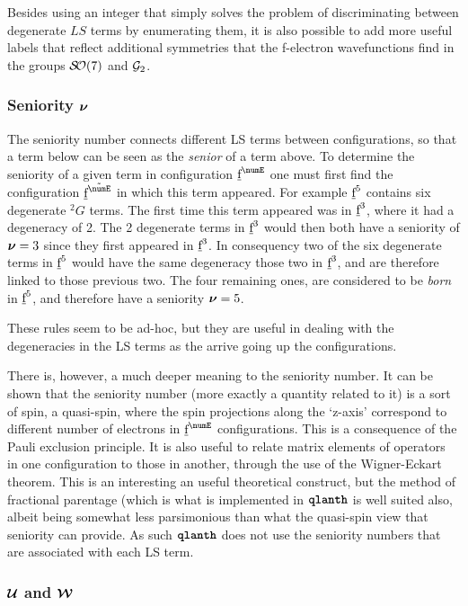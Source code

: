 \documentclass{article}
\begin{document}
Besides using an integer that simply solves the problem of discriminating between degenerate $LS$ terms by enumerating them, it is also possible to add more useful labels that reflect additional symmetries that the f-electron wavefunctions find in the groups $\mathcal{S\!O}(7)$ and $\mathcal{G}_2$.

\subsubsection{Seniority $\boldsymbol{\nu}$}

The seniority number connects different LS terms between configurations, so that a term below can be seen as the \textit{senior} of a term above. To determine the seniority of a given term in configuration $\forb^\numE$ one must first find the configuration $\forb^{\tilde{\numE}}$ in which this term appeared. For example $\underbar{$\text{f}$}^{5}$ contains six degenerate ${}^2G$ terms. The first time this term appeared was in $\underbar{$\text{f}$}^3$, where it had a degeneracy of 2. The 2 degenerate terms in $\underbar{$\text{f}$}^3$ would then both have a seniority of $\boldsymbol{\nu}=3$ since they first appeared in $\underbar{$\text{f}$}^3$. In consequency two of the six degenerate terms in $\underbar{$\text{f}$}^5$ would have the same degeneracy those two in $\underbar{$\text{f}$}^3$, and are therefore linked to those previous two. The four remaining ones, are  considered to be \textit{born} in $\underbar{$\text{f}$}^5$, and therefore have a seniority $\boldsymbol{\nu}=5$.

These rules seem to be ad-hoc, but they are useful in dealing with the degeneracies in the LS terms as the arrive going up the configurations.

There is, however, a much deeper meaning to the seniority number. It can be shown that the seniority number (more exactly a quantity related to it) is a sort of spin, a quasi-spin, where the spin projections along the `z-axis' correspond to different number of electrons in $\forb^\numE$ configurations. This is a consequence of the Pauli exclusion principle. It is also useful to relate matrix elements of operators in one configuration to those in another, through the use of the Wigner-Eckart theorem. This is an interesting an useful theoretical construct, but the method of fractional parentage (which is what is implemented in $\textbf{\texttt{qlanth}}$ is well suited also, albeit being somewhat less parsimonious than what the quasi-spin view that seniority can provide. As such $\textbf{\texttt{qlanth}}$ does not use the seniority numbers that are associated with each LS term.

\subsubsection{$\boldsymbol{\mathcal{U}}$ and $\boldsymbol{\mathcal{W}}$}
\end{document}
